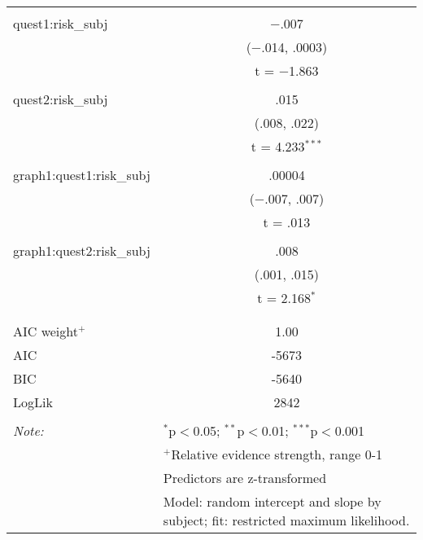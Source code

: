 \begin{table}[!htbp]
\begin{tabular}{@{\extracolsep{5pt}}lc}
  & \\ 
 quest1:risk\_subj & $-$.007 \\ 
  & ($-$.014, .0003) \\ 
  & t = $-$1.863 \\ 
  & \\ 
 quest2:risk\_subj & .015 \\ 
  & (.008, .022) \\ 
  & t = 4.233$^{***}$ \\ 
  & \\ 
 graph1:quest1:risk\_subj & .00004 \\ 
  & ($-$.007, .007) \\ 
  & t = .013 \\ 
  & \\ 
 graph1:quest2:risk\_subj & .008 \\ 
  & (.001, .015) \\ 
  & t = 2.168$^{*}$ \\ 
  & \\ 
\hline \\[-1.8ex] 
AIC weight$^{+}$ & 1.00 \\ 
AIC & -5673 \\ 
BIC & -5640 \\ 
LogLik & 2842 \\ 
\hline 
\hline \\[-1.8ex] 
\textit{Note:}  & \multicolumn{1}{l}{$^{*}$p$<$0.05; $^{**}$p$<$0.01; $^{***}$p$<$0.001} \\ 
 & \multicolumn{1}{l}{$^{+}$Relative evidence strength, range 0-1 {\citep{Wagenmakers2004}}} \\ 
 & \multicolumn{1}{l}{Predictors are z-transformed} \\ 
 & \multicolumn{1}{l}{Model: random intercept and slope by subject; fit: restricted maximum likelihood.} \\ 
\end{tabular} 
\end{table} 
